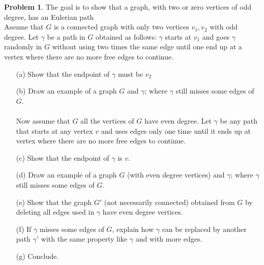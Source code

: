 \documentclass[11pt]{article}
\theoremstyle{definition}
\newtheorem{problem}{Problem}
\begin{document}
\begin{problem}
    The goal is to show that a graph, with two or zero vertices of odd degree, has an Eulerian path\\
    Assume that $G$ is a connected graph with only two vertices $v_1, v_2$ with odd degree. Let $\gamma$ be a path in $G$ obtained as follows: $\gamma$ starts at $v_1$ and goes $\gamma$ randomly in $G$ without using two times the same edge until one end up at a vertex where there are no more free edges to continue.
    \begin{enumerate}
        \item [(a)] Show that the endpoint of $\gamma$ must be $v_2$
        \item [(b)] Draw an example of a graph $G$ and $\gamma$; where $\gamma$ still misses some edges of $G.$\\\\
        Now assume that $G$ all the vertices of $G$ have even degree. Let $\gamma$ be any path that starts at any vertex $v$ and uses edges only one time until it ends up at vertex where there are no more free edges to continue.
        \item [(c)] Show that the endpoint of $\gamma$ is $v.$
        \item [(d)] Draw an example of a graph $G$ (with even degree vertices) and $\gamma$; where $\gamma$ still misses some edges of $G.$
        \item [(e)] Show that the graph $G'$ (not necessarily connected) obtained from $G$ by deleting all edges used in $\gamma$ have even degree vertices.
        \item [(f)] If $\gamma$ misses some edges of $G$, explain how $\gamma$ can be replaced by another path $\gamma'$ with the same property like $\gamma$ and with more edges.
        \item [(g)] Conclude.
    \end{enumerate}
\end{problem}
\end{document}
